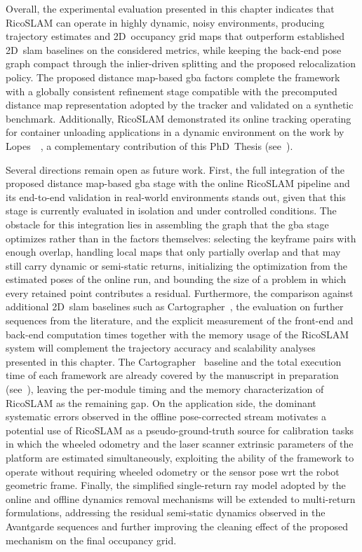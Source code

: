Overall, the experimental evaluation presented in this chapter
indicates that RicoSLAM can operate in highly dynamic, noisy
environments, producing trajectory estimates and 2D~occupancy grid maps
that outperform established 2D~\gls{slam} baselines on the considered
metrics, while keeping the back-end pose graph compact through the
inlier-driven splitting and the proposed relocalization policy. The
proposed distance map-based \gls{gba} factors complete the framework with
a globally consistent refinement stage compatible with the precomputed
distance map representation adopted by the tracker and validated on a
synthetic benchmark.
Additionally, RicoSLAM demonstrated its online tracking operating for
container unloading applications in a dynamic environment on the work by
Lopes~\etal~\cite{lopes:icara:2026}, a complementary contribution of this
PhD~Thesis (see~).

Several directions remain open as future work. First, the full
integration of the proposed distance map-based \gls{gba} stage with the
online RicoSLAM pipeline and its end-to-end validation in real-world
environments stands out, given that this stage is currently evaluated in
isolation and under controlled conditions. The obstacle for this integration
lies in assembling the graph that the \gls{gba} stage optimizes rather than
in the factors themselves: selecting the keyframe pairs with enough
overlap, handling local maps that only partially overlap and that
may still carry dynamic or semi-static returns, initializing the optimization
from the estimated poses of the online run, and bounding the size of a
problem in which every retained point contributes a residual.
Furthermore, the comparison against additional 2D~\gls{slam} baselines such as
Cartographer~\cite{hess:icra:2016}, the evaluation on further sequences
from the literature, and the explicit measurement of the front-end and
back-end computation times together with the memory usage of the
RicoSLAM system will complement the trajectory accuracy and scalability
analyses presented in this chapter. The Cartographer~\cite{hess:icra:2016}
baseline and the total execution time of each framework are already covered
by the manuscript in preparation~\cite{sousa:ral:2026}
(see~), leaving the per-module timing and the memory
characterization of RicoSLAM as the remaining gap. On the application side, the
dominant systematic errors observed in the offline pose-corrected
stream motivates a potential use of RicoSLAM as a pseudo-ground-truth
source for calibration tasks in which the wheeled odometry and the laser scanner
extrinsic parameters of the platform are estimated
simultaneously, exploiting the ability of the framework to operate
without requiring wheeled odometry or the sensor pose \gls{wrt} the
robot geometric frame. Finally, the simplified
single-return ray model adopted by the online and offline dynamics
removal mechanisms will be extended to multi-return formulations,
addressing the residual semi-static dynamics observed in the Avantgarde
sequences and further improving the cleaning effect of the proposed
mechanism on the final occupancy grid.
